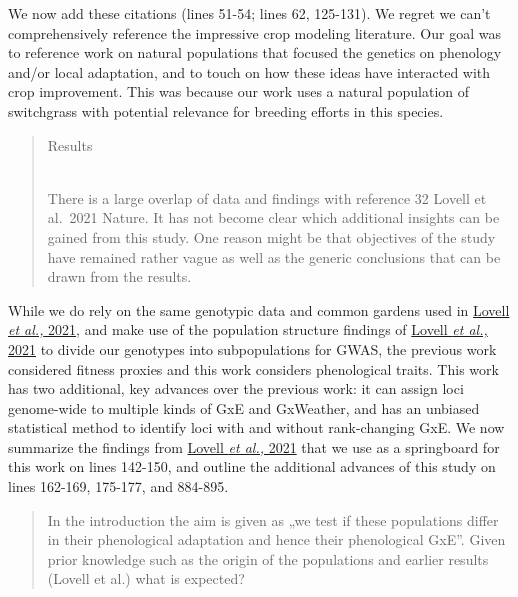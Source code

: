 \documentclass[
  letterpaper,
  DIV=11,
  numbers=noendperiod]{scrartcl}
\begin{document}
We now add these citations (lines 51-54; lines 62, 125-131). We regret
we can't comprehensively reference the impressive crop modeling
literature. Our goal was to reference work on natural populations that
focused the genetics on phenology and/or local adaptation, and to touch
on how these ideas have interacted with crop improvement. This was
because our work uses a natural population of switchgrass with potential
relevance for breeding efforts in this species.

\begin{quote}
\begin{tcolorbox}[enhanced jigsaw, rightrule=.15mm, colframe=quarto-callout-warning-color-frame, leftrule=.75mm, arc=.35mm, colback=white, opacityback=0, left=2mm, breakable, toprule=.15mm, bottomrule=.15mm]

Results\\
\strut \\
There is a large overlap of data and findings with reference 32 Lovell
et al.~2021 Nature. It has not become clear which additional insights
can be gained from this study. One reason might be that objectives of
the study have remained rather vague as well as the generic conclusions
that can be drawn from the results.

\end{tcolorbox}
\end{quote}

While we do rely on the same genotypic data and common gardens used in
\href{https://doi.org/10.1038/s41586-020-03127-1}{Lovell \emph{et al.,}
2021}, and make use of the population structure findings of
\href{https://doi.org/10.1038/s41586-020-03127-1}{Lovell \emph{et al.,}
2021} to divide our genotypes into subpopulations for GWAS, the previous
work considered fitness proxies and this work considers phenological
traits. This work has two additional, key advances over the previous
work: it can assign loci genome-wide to multiple kinds of GxE and
GxWeather, and has an unbiased statistical method to identify loci with
and without rank-changing GxE. We now summarize the findings from
\href{https://doi.org/10.1038/s41586-020-03127-1}{Lovell \emph{et al.,}
2021} that we use as a springboard for this work on lines 142-150, and
outline the additional advances of this study on lines 162-169, 175-177,
and 884-895.

\begin{quote}
\begin{tcolorbox}[enhanced jigsaw, rightrule=.15mm, colframe=quarto-callout-warning-color-frame, leftrule=.75mm, arc=.35mm, colback=white, opacityback=0, left=2mm, breakable, toprule=.15mm, bottomrule=.15mm]

In the introduction the aim is given as „we test if these populations
differ in their phenological adaptation and hence their phenological
GxE''. Given prior knowledge such as the origin of the populations and
earlier results (Lovell et al.) what is expected?

\end{tcolorbox}
\end{quote}
\end{document}
